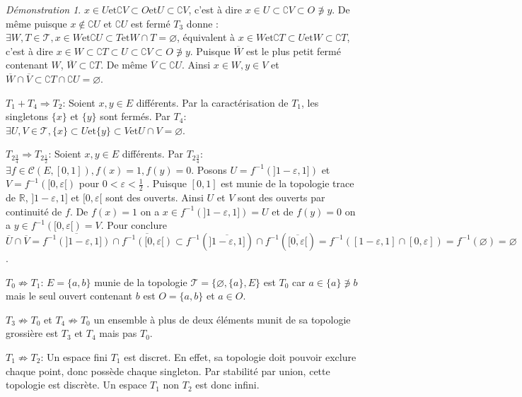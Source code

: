 \documentclass[a4paper, 11pt, french]{book}
\newenvironment{itemise}{\itemize}{\enditemize}
\theoremstyle{plain} %
\theoremstyle{definition} %
\theoremstyle{remark} %
\newtheorem*{demonstration}{Démonstration}
\newcommand{\1}{\mathds{1}}
\newcommand\vide{\varnothing}
\newcommand{\inv}[1]{#1^{-1}}
\newcommand{\et}{\mathrel{\mathrm{et}}}
\newcommand{\R}{\mathbb{R}}
\renewcommand{\cal}[1]{\mathcal{#1}}
\newcommand{\scr}[1]{\mathscr{#1}}
\begin{document}
\begin{demonstration}
\begin{itemise}
		$x\in U\et\complement V\subset O\et U\subset\complement V$, c'est à dire
		$x\in U\subset\complement V\subset O\not\ni y$.
		De même puisque $x\notin\complement U$ et $\complement U$ est fermé $T_3$ donne :
		$\exists W, T\in\scr{T}, x\in W\et\complement U\subset T\et W\cap T=\vide$, équivalent à
		$x\in W\et\complement T\subset U\et W\subset\complement T$, c'est à dire
		$x\in W\subset\complement T\subset U\subset\complement V\subset O\not\ni y$.
		Puisque $\overline{W}$ est le plus petit fermé contenant $W$, $\overline{W}\subset\complement T$.
		De même $\overline{V}\subset\complement U$.
		Ainsi $x\in W, y\in V$ et $\overline{W}\cap\overline{V}\subset\complement T\cap\complement U=\vide$.
		\item[$T_1+T_4\Rightarrow T_2$:] Soient $x, y\in E$ différents.
		Par la caractérisation de $T_1$, les singletons $\{x\}$ et $\{y\}$ sont fermés.
		Par $T_4$: $\exists U, V\in\scr{T}, \{x\}\subset U\et\{y\}\subset V\et U\cap V=\vide$.
		\item[$T_{2\frac{3}{4}}\Rightarrow T_{2\frac{1}{2}}$:] Soient $x, y\in E$ différents.
		Par $T_{2\frac{3}{4}}$: $\exists f\in\cal{C}(E, [0, 1]), f(x)=1, f(y)=0$.
		Posons $U=\inv{f}(]1-\varepsilon, 1])$ et $V=\inv{f}([0, \varepsilon[)$ pour $0<\varepsilon<\frac{1}{2}$ .
		Puisque $[0, 1]$ est munie de la topologie trace de $\R$, $]1-\varepsilon, 1]$ et $[0, \varepsilon[$ sont des ouverts.
		Ainsi $U$ et $V$ sont des ouverts par continuité de $f$.
		De $f(x)=1$ on a $x\in\inv{f}(]1-\varepsilon, 1])=U$ et de $f(y)=0$ on a $y\in\inv{f}([0, \varepsilon[)=V$.
		Pour conclure
		$\overline{U}\cap\overline{V}
			=\overline{\inv{f}(]1-\varepsilon, 1])}\cap\overline{\inv{f}([0, \varepsilon[)}
			\subset\inv{f}(\overline{]1-\varepsilon, 1]})\cap\inv{f}(\overline{[0, \varepsilon[})
			=\inv{f}([1-\varepsilon, 1]\cap[0, \varepsilon])
			=\inv{f}(\vide)
			=\vide$.
		\item[$T_0\not\Rightarrow T_1$:] $E=\{a, b\}$ munie de la topologie $\scr{T}=\{\vide, \{a\}, E\}$ est $T_0$ car $a\in\{a\}\not\ni b$ mais le seul ouvert contenant $b$ est $O=\{a, b\}$ et $a\in O$.
		\item[$T_3\not\Rightarrow T_0$ et $T_4\not\Rightarrow T_0$] un ensemble à plus de deux éléments munit de sa topologie grossière est $T_3$ et $T_4$ mais pas $T_0$.
		\item[$T_1\not\Rightarrow T_2$:] Un espace fini $T_1$ est discret.
		En effet, sa topologie doit pouvoir exclure chaque point, donc possède chaque singleton.
		Par stabilité par union, cette topologie est discrète.
		Un espace $T_1$ non $T_2$ est donc infini.

\end{itemise}
\end{demonstration}
\end{document}
